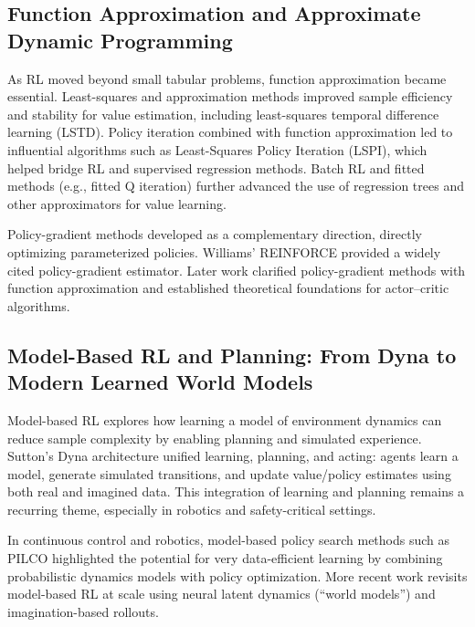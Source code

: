\documentclass[sigconf]{acmart}
\begin{document}
\subsection{Function Approximation and Approximate Dynamic Programming}

As RL moved beyond small tabular problems, function approximation became essential.
Least-squares and approximation methods improved sample efficiency and stability for value estimation, including least-squares temporal difference learning (LSTD).\cite{bradtke1996lstd}
Policy iteration combined with function approximation led to influential algorithms such as Least-Squares Policy Iteration (LSPI), which helped bridge RL and supervised regression methods.\cite{lagoudakis2003lspi}
Batch RL and fitted methods (e.g., fitted Q iteration) further advanced the use of regression trees and other approximators for value learning.\cite{ernst2005tree}

Policy-gradient methods developed as a complementary direction, directly optimizing parameterized policies.
Williams' REINFORCE provided a widely cited policy-gradient estimator.\cite{williams1992reinforce}
Later work clarified policy-gradient methods with function approximation and established theoretical foundations for actor--critic algorithms.\cite{sutton2000policygradient,konda2000actorcritic}

\subsection{Model-Based RL and Planning: From Dyna to Modern Learned World Models}

Model-based RL explores how learning a model of environment dynamics can reduce sample complexity by enabling planning and simulated experience.
Sutton's Dyna architecture unified learning, planning, and acting: agents learn a model, generate simulated transitions, and update value/policy estimates using both real and imagined data.\cite{sutton1990dyna}
This integration of learning and planning remains a recurring theme, especially in robotics and safety-critical settings.

In continuous control and robotics, model-based policy search methods such as PILCO highlighted the potential for very data-efficient learning by combining probabilistic dynamics models with policy optimization.\cite{deisenroth2011pilco}
More recent work revisits model-based RL at scale using neural latent dynamics (``world models'') and imagination-based rollouts.\cite{hafner2020dreamer,janner2019mbpo}
\end{document}
